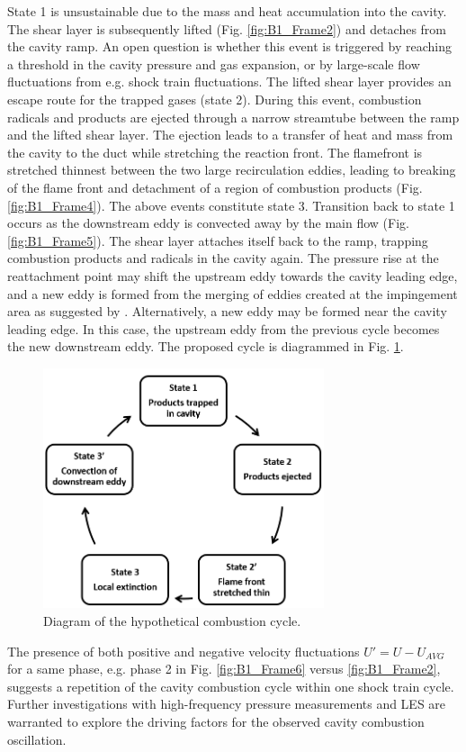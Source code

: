 State 1 is unsustainable due to the mass and heat accumulation into the cavity. The shear layer is subsequently lifted (Fig. \ref{fig:B1_Frame2}) and detaches from the cavity ramp. An open question is whether this event is triggered by reaching a threshold in the cavity pressure and gas expansion, or by large-scale flow fluctuations from e.g. shock train fluctuations. 
The lifted shear layer provides an escape route for the trapped gases (state 2). During this event, combustion radicals and products are ejected through a narrow streamtube between the ramp and the lifted shear layer.
The ejection leads to a transfer of heat and mass from the cavity to the duct while stretching the reaction front. 
The flamefront is stretched thinnest between the two large recirculation eddies, leading to breaking of the flame front and detachment of a region of combustion products (Fig. \ref{fig:B1_Frame4}). The above events constitute state 3. Transition back to state 1 occurs as the downstream eddy is convected away by the main flow (Fig. \ref{fig:B1_Frame5}). The shear layer attaches itself back to the ramp, trapping combustion products and radicals in the cavity again. The pressure rise at the reattachment point may shift the upstream eddy towards the cavity leading edge, and a new eddy is formed from the merging of eddies created at the impingement area as suggested by \cite{TuttleCarterHsu2014}. Alternatively, a new eddy may be formed near the cavity leading edge. In this case, the upstream eddy from the previous cycle becomes the new downstream eddy. The proposed cycle is diagrammed in Fig. \ref{fig:cycle_diagram}. 

\begin{figure}
\centering
\includegraphics[width=3.25in]{figures/cycle_diagram.png}
\caption{Diagram of the hypothetical combustion cycle.}
\label{fig:cycle_diagram}
\end{figure}

The presence of both positive and negative velocity fluctuations $U'=U-U_{AVG}$ for a same phase, e.g. phase 2 in Fig. \ref{fig:B1_Frame6} versus \ref{fig:B1_Frame2}, suggests a repetition of the cavity combustion cycle within one shock train cycle. Further investigations with high-frequency pressure measurements and LES are warranted to explore the driving factors for the observed cavity combustion oscillation. 